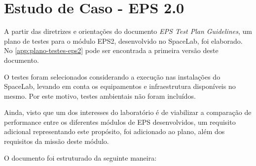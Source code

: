 \chapter{Estudo de Caso - EPS 2.0}

A partir das diretrizes e orientações do documento \textit{EPS Test Plan Guidelines}, um plano de testes para o módulo \gls{EPS2}, desenvolvido no SpaceLab, foi elaborado.
No \autoref{app:plano-testes-eps2} pode ser encontrada a primeira versão deste documento.

O testes foram selecionados considerando a execução nas instalações do SpaceLab, levando em conta os equipamentos e infraestrutura disponíveis no mesmo. Por este motivo, testes ambientais não foram incluídos.

Ainda, visto que um dos interesses do laboratório é de viabilizar a comparação de performance entre os diferentes módulos de \gls{EPS} desenvolvidos, um requisito adicional representando este propósito, foi adicionado ao plano, além dos requisitos da missão deste módulo.

O documento foi estruturado da seguinte maneira:


